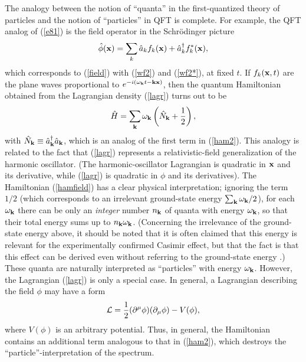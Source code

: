 \documentclass[12pt]{article}
\begin{document}
The analogy between the notion of ``quanta'' in the first-quantized 
theory of particles and the notion of ``particles'' in QFT is 
complete. For example, the QFT analog of (\ref{e81}) is the 
field operator in the Schr\"odinger picture
\begin{equation}
\hat{\phi}({\bf x})=\sum_k \hat{a}_k f_k({\bf x}) + 
\hat{a}_k^{\dagger} f_k^*({\bf x}) ,
\end{equation}
which corresponds to (\ref{field}) with (\ref{wf2}) and (\ref{wf2*}), 
at fixed $t$. If $f_k({\bf x},t)$ are the plane waves proportional 
to $e^{-i(\omega_{\bf k}t-{\bf k}{\bf x})}$, then 
the quantum Hamiltonian obtained from the 
Lagrangian density (\ref{lagr}) turns out to be
\begin{equation}\label{hamfield}
\hat{H}=\sum_{\bf k} \omega_{\bf k}\left(\hat{N}_{\bf k} +\frac{1}{2}
\right) ,
\end{equation}
with $\hat{N}_{\bf k}\equiv \hat{a}_{\bf k}^{\dagger} \hat{a}_{\bf k}$, 
which is an analog of the first term in (\ref{ham2}). 
This analogy is related to the fact that (\ref{lagr}) represents 
a relativistic-field generalization of the harmonic oscillator.
(The harmonic-oscillator Lagrangian is quadratic in 
${\bf x}$ and its derivative, while (\ref{lagr}) is quadratic 
in $\phi$ and its derivatives).
The Hamiltonian (\ref{hamfield}) has a clear physical interpretation;
ignoring the term $1/2$ (which corresponds to an irrelevant
ground-state energy $\sum_{\bf k} \omega_{\bf k}/2$),
for each $\omega_{\bf k}$ there can be only an {\em integer}
number $n_{\bf k}$ of quanta with energy $\omega_{\bf k}$, so that 
their total energy sums up to $n_{\bf k}\omega_{\bf k}$.
(Concerning the irrelevance of the ground-state energy above,
it should be noted that it is often claimed that this energy is relevant 
for the experimentally confirmed Casimir effect, 
but that the fact is that this effect 
can be derived even without referring to the ground-state energy
\cite{jaffe}.) 
These quanta are naturally interpreted as ``particles'' with  
energy $\omega_{\bf k}$.  
However, the Lagrangian (\ref{lagr}) is only a special case.
In general, a Lagrangian describing the field $\phi$ may have a form
\begin{equation}\label{lagr2}
{\cal L}=
\frac{1}{2} (\partial^{\mu}\phi)(\partial_{\mu}\phi) -V(\phi) ,
\end{equation} 
where $V(\phi)$ is an arbitrary potential. Thus, in general, 
the Hamiltonian contains an additional term analogous to that in 
(\ref{ham2}), which destroys the ``particle''-interpretation of the 
spectrum.
\end{document}
